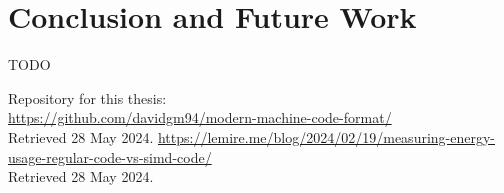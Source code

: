 \documentclass[12pt]{article}
\begin{document}
	\section{Conclusion and Future Work}
	TODO

	\begin{thebibliography}{9}
		Repository for this thesis:\\ \href{https://github.com/davidgm94/modern-machine-code-format/}{https://github.com/davidgm94/modern-machine-code-format/}\\Retrieved 28 May 2024.
		\href{https://lemire.me/blog/2024/02/19/measuring-energy-usage-regular-code-vs-simd-code}{https://lemire.me/blog/2024/02/19/measuring-energy-usage-regular-code-vs-simd-code/}\\Retrieved 28 May 2024.
		
	\end{thebibliography}
\end{document}
